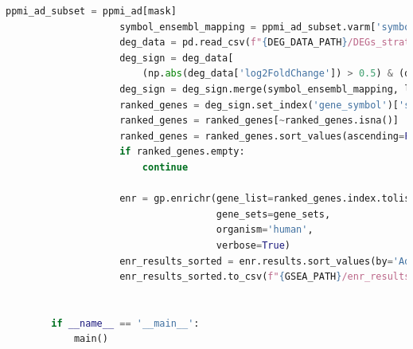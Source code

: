 \documentclass[12pt]{report}
\begin{document}
\begin{lstlisting}[language=Python,caption={gsea\_stratified\_batch\_consolidated\_visits.py: Ανάλυση εμπλουτισμού με χρήση της βιβλιοθήκης gseapy σε Python}, label=lst:gseastratifiedbatchconsolidatedvisits]
                    ppmi_ad_subset = ppmi_ad[mask]
                    symbol_ensembl_mapping = ppmi_ad_subset.varm['symbol_ensembl_mapping']
                    deg_data = pd.read_csv(f"{DEG_DATA_PATH}/DEGs_stratified_consoVisits_{gender}_{age_group}.csv", index_col=0)
                    deg_sign = deg_data[
                        (np.abs(deg_data['log2FoldChange']) > 0.5) & (deg_data['padj'] < 0.05)]
                    deg_sign = deg_sign.merge(symbol_ensembl_mapping, left_index=True, right_index=True)
                    ranked_genes = deg_sign.set_index('gene_symbol')['stat'].sort_values(ascending=False)
                    ranked_genes = ranked_genes[~ranked_genes.isna()]
                    ranked_genes = ranked_genes.sort_values(ascending=False, key=abs)
                    if ranked_genes.empty:
                        continue
        
                    enr = gp.enrichr(gene_list=ranked_genes.index.tolist(),
                                     gene_sets=gene_sets,
                                     organism='human',
                                     verbose=True)
                    enr_results_sorted = enr.results.sort_values(by='Adjusted P-value', ascending=True)
                    enr_results_sorted.to_csv(f"{GSEA_PATH}/enr_results_sorted_consoVisits_{gender}_{age_group}.csv")
        
        
        if __name__ == '__main__':
            main()
    \end{lstlisting}
    

    \printbibliography
\end{document}
